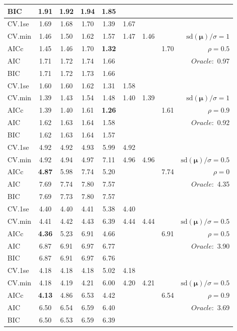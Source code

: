 \begin{table}
\begin{center}
\begin{tabular}{l*{7}{c}|r}
BIC & 1.91 & 1.92 & 1.94 & 1.85 & & & &  \\
 \hline 
CV.1se & 1.69 & 1.68 & 1.70 & 1.39 & 1.67 & & & \\
CV.min & 1.46 & 1.50 & 1.62 & 1.57 & 1.47 & 1.46 & & $\mathrm{sd}(\mathbf{\mu})/\sigma=1$ \\
AICc & 1.45 & 1.46 & 1.70 & {\bf 1.32} & & & 1.70 &  $\rho=0.5$ \\
AIC & 1.71 & 1.72 & 1.74 & 1.66 & & & &  \multirow{2}{*}{$Oracle: $ 0.97} \\
BIC & 1.71 & 1.72 & 1.73 & 1.66 & & & &  \\
 \hline 
CV.1se & 1.60 & 1.60 & 1.62 & 1.31 & 1.58 & & & \\
CV.min & 1.39 & 1.43 & 1.54 & 1.48 & 1.40 & 1.39 & & $\mathrm{sd}(\mathbf{\mu})/\sigma=1$ \\
AICc & 1.39 & 1.40 & 1.61 & {\bf 1.26} & & & 1.61 &  $\rho=0.9$ \\
AIC & 1.62 & 1.63 & 1.64 & 1.58 & & & &  \multirow{2}{*}{$Oracle: $ 0.92} \\
BIC & 1.62 & 1.63 & 1.64 & 1.57 & & & &  \\
 \hline 
CV.1se & 4.92 & 4.92 & 4.93 & 5.99 & 4.92 & & & \\
CV.min & 4.92 & 4.94 & 4.97 & 7.11 & 4.96 & 4.96 & & $\mathrm{sd}(\mathbf{\mu})/\sigma=0.5$ \\
AICc & {\bf 4.87} & 5.98 & 7.74 & 5.20 & & & 7.74 &  $\rho=0$ \\
AIC & 7.69 & 7.74 & 7.80 & 7.57 & & & &  \multirow{2}{*}{$Oracle: $ 4.35} \\
BIC & 7.69 & 7.73 & 7.80 & 7.57 & & & &  \\
 \hline 
CV.1se & 4.40 & 4.40 & 4.41 & 5.38 & 4.40 & & & \\
CV.min & 4.41 & 4.42 & 4.43 & 6.39 & 4.44 & 4.44 & & $\mathrm{sd}(\mathbf{\mu})/\sigma=0.5$ \\
AICc & {\bf 4.36} & 5.23 & 6.91 & 4.66 & & & 6.91 &  $\rho=0.5$ \\
AIC & 6.87 & 6.91 & 6.97 & 6.77 & & & &  \multirow{2}{*}{$Oracle: $ 3.90} \\
BIC & 6.87 & 6.91 & 6.97 & 6.76 & & & &  \\
 \hline 
CV.1se & 4.18 & 4.18 & 4.18 & 5.02 & 4.18 & & & \\
CV.min & 4.18 & 4.19 & 4.21 & 6.00 & 4.20 & 4.21 & & $\mathrm{sd}(\mathbf{\mu})/\sigma=0.5$ \\
AICc & {\bf 4.13} & 4.86 & 6.53 & 4.42 & & & 6.54 &  $\rho=0.9$ \\
AIC & 6.50 & 6.54 & 6.59 & 6.40 & & & &  \multirow{2}{*}{$Oracle: $ 3.69} \\
BIC & 6.50 & 6.53 & 6.59 & 6.39 & & & &  \\
 \hline 
\end{tabular}
\end{center}
\vspace{-1cm}
\end{table}




